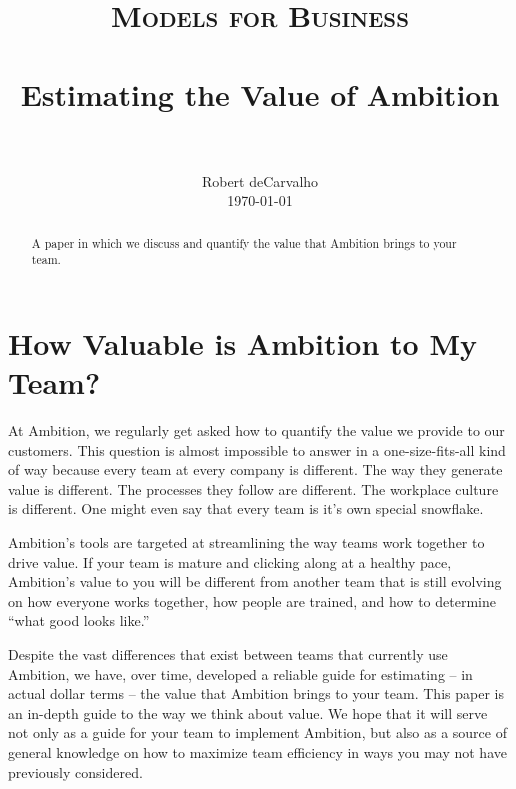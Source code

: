 \documentclass[paper=a4, fontsize=11pt abstract]{scrartcl}
\title{
		\usefont{OT1}{bch}{b}{n}
		\normalfont \normalsize \textsc{Models for Business} \\ [25pt]
		\horrule{0.5pt} \\[0.4cm]
		\huge Estimating the Value of Ambition\\
		\horrule{2pt} \\[0.5cm]
}
\author{
		\normalfont
		\normalsize
        Robert deCarvalho\\[-3pt]
        \normalsize
        \today
}
\date{}
\numberwithin{equation}{section}		%
\numberwithin{figure}{section}			%
\numberwithin{table}{section}				%
\begin{document}
\maketitle


\begin{abstract}
A paper in which we discuss and quantify the value that Ambition brings to your team.
\end{abstract}


\section{How Valuable is Ambition to My Team?}
At Ambition, we regularly get asked how to quantify the value we provide to our customers.  This question is almost impossible to answer in a one-size-fits-all kind of way because every team at every company is different.  The way they generate value is different.  The processes they follow are different. The workplace culture is different.  One might even say that every team is it's own special snowflake.

Ambition's tools are targeted at streamlining the way teams work together to drive value. If your team is mature and clicking along at a healthy pace, Ambition's value to you will be different from another team that is still evolving on how everyone works together, how people are trained, and how to determine ``what good looks like.''

Despite the vast differences that exist between teams that currently use Ambition, we have, over time, developed a reliable guide for estimating -- in actual dollar terms -- the value that Ambition brings to your team.  This paper is an in-depth guide to the way we think about value. We hope that it will serve not only as a guide for your team to implement Ambition, but also as a source of general knowledge on how to maximize team efficiency in ways you may not have previously considered.
\end{document}
